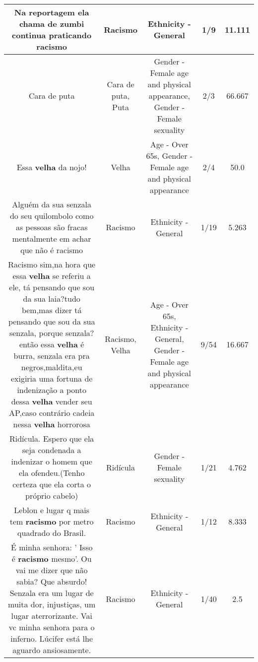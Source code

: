\documentclass[11pt]{article}
\newlength\mylength
\begin{document}
\begin{center}
\begin{longtable}{|C{.65\mylength}|C{.30\mylength}|C{.12\mylength}|C{.12\mylength}|C{.12\mylength}|}
  \small Na reportagem ela chama de zumbi continua praticando racismo\normalsize   & Racismo & Ethnicity - General & 1/9 & 11.111 \\  \hline
  \small Cara de puta\normalsize   & Cara de puta, Puta & Gender - Female age and physical appearance, Gender - Female sexuality & 2/3 & 66.667 \\  \hline
  \small Essa \textbf{v\textbf{elha}} da nojo!\normalsize   & Velha & Age - Over 65s, Gender - Female age and physical appearance & 2/4 & 50.0 \\  \hline
  \small Alguém da sua senzala do seu quilombolo como as pessoas são fracas mentalmente em achar que não é racismo\normalsize   & Racismo & Ethnicity - General & 1/19 & 5.263 \\  \hline
  \small Racismo sim,na hora que essa \textbf{v\textbf{elha}} se referiu a ele, tá pensando que sou da sua laia?tudo bem,mas dizer tá pensando que sou da sua senzala, porque senzala? então essa \textbf{v\textbf{elha}} é burra, senzala era pra negros,maldita,eu exigiria uma fortuna de indenização a ponto dessa \textbf{v\textbf{elha}} vender seu AP,caso contrário cadeia nessa \textbf{v\textbf{elha}} horrorosa\normalsize   & Racismo, Velha & Age - Over 65s, Ethnicity - General, Gender - Female age and physical appearance & 9/54 & 16.667 \\  \hline
  \small Ridícula. Espero que ela seja condenada a indenizar o homem que ela ofendeu.(Tenho certeza que ela corta o próprio cabelo)\normalsize   & Ridícula & Gender - Female sexuality & 1/21 & 4.762 \\  \hline
  \small Leblon  e lugar q mais tem \textbf{racismo}  por metro  quadrado  do Brasil.\normalsize   & Racismo & Ethnicity - General & 1/12 & 8.333 \\  \hline
  \small É minha senhora: ' Isso é \textbf{racismo} mesmo'. Ou vai me dizer que não sabia? Que absurdo! Senzala era um lugar de muita dor, injustiças, um lugar aterrorizante. Vai vc minha senhora para o inferno. Lúcifer está lhe aguardo ansiosamente.\normalsize   & Racismo & Ethnicity - General & 1/40 & 2.5 \\  \hline

\end{longtable}
\end{center}
\end{document}
